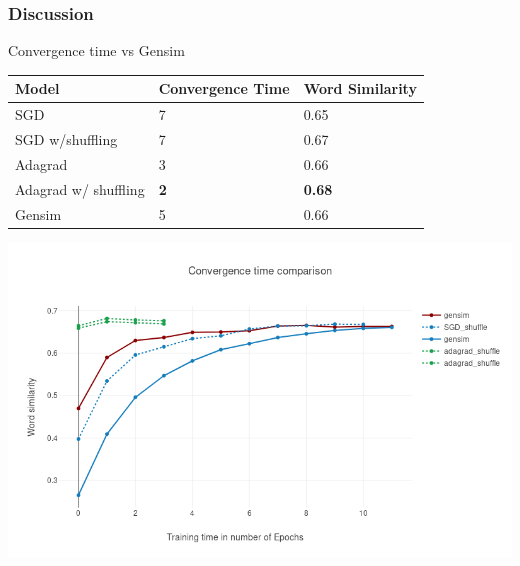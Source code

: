 \begin{frame}
\frametitle{Discussion}
Convergence time vs Gensim 
    \begin{table}[]
\begin{tabular}{|l|l|l|}
\hline
Model    & Convergence Time & Word Similarity \\ \hline
SGD & {7}              & 0.65            \\ \hline
SGD w/shuffling & {7}              & 0.67            \\ \hline
Adagrad & {3}              & 0.66            \\ \hline
Adagrad w/ shuffling & \textbf{2}              & \textbf{0.68}      \\ \hline
Gensim   & 5          & 0.66            \\ \hline
\end{tabular}
\end{table}
\includegraphics[scale=0.3]{images/gensim_vs_adam}
  \end{frame}
